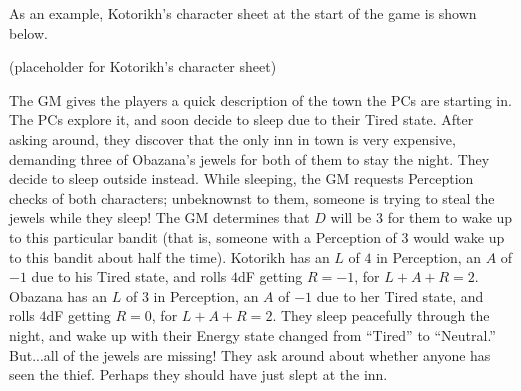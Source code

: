 \begin{example}
As an example, Kotorikh’s character sheet at the start of the game is shown below.

(placeholder for Kotorikh's character sheet)

The GM gives the players a quick description of the town the PCs are starting in.
The PCs explore it, and soon decide to sleep due to their Tired state.
After asking around, they discover that the only inn in town is very expensive, demanding three of Obazana’s jewels for both of them to stay the night.
They decide to sleep outside instead.
While sleeping, the GM requests Perception checks of both characters; unbeknownst to them, someone is trying to steal the jewels while they sleep!
The GM determines that $D$ will be $3$ for them to wake up to this particular bandit (that is, someone with a Perception of $3$ would wake up to this bandit about half the time).
Kotorikh has an $L$ of $4$ in Perception, an $A$ of $-1$ due to his Tired state, and rolls $4$dF getting $R = -1$, for $L+A+R = 2$.
Obazana has an $L$ of $3$ in Perception, an $A$ of $-1$ due to her Tired state, and rolls $4$dF getting $R = 0$, for $L+A+R = 2$.
They sleep peacefully through the night, and wake up with their Energy state changed from “Tired” to “Neutral.” But...all of the jewels are missing!
They ask around about whether anyone has seen the thief.
Perhaps they should have just slept at the inn.

\end{example}


